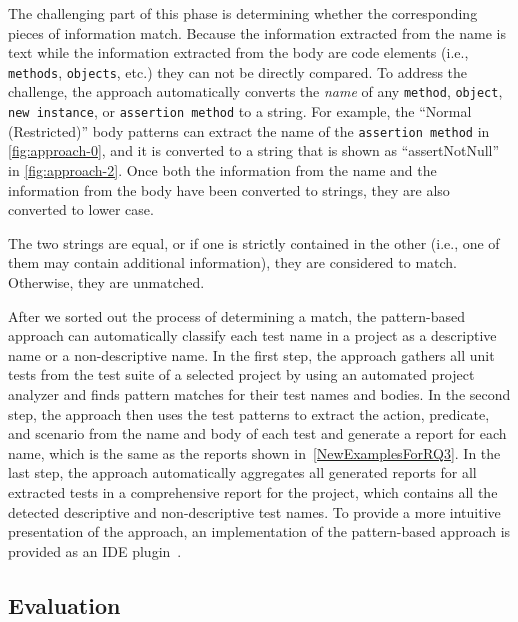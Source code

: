 The challenging part of this phase is determining whether the corresponding pieces of information match.
%
Because the information extracted from the name is text while the information extracted from the body are code elements (i.e., \texttt{methods}, \texttt{objects}, etc.) they can not be directly compared.
%
To address the challenge, the approach automatically converts the \emph{name} of any \texttt{method}, \texttt{object}, \texttt{new instance}, or \texttt{assertion method} to a string.
%
For example, the \enquote{Normal (Restricted)} body patterns can extract the name of the \texttt{assertion method} in \cref{fig:approach-0}, and it is converted to a string that is shown as \enquote{assertNotNull} in \cref{fig:approach-2}.
%
Once both the information from the name and the information from the body have been converted to strings, they are also converted to lower case.


The two strings are equal, or if one is strictly contained in the other (i.e., one of them may contain additional information), they are considered to match.
%
Otherwise, they are unmatched.


After we sorted out the process of determining a match, the pattern-based approach can automatically classify each test name in a project as a descriptive name or a non-descriptive name.
%
In the first step, the approach gathers all unit tests from the test suite of a selected project by using an automated project analyzer and finds pattern matches for their test names and bodies.
%
In the second step, the approach then uses the test patterns to extract the action, predicate, and scenario from the name and body of each test and generate a report for each name, which is the same as the reports shown in~\cref{NewExamplesForRQ3}.
%
In the last step, the approach automatically aggregates all generated reports for all extracted tests in a comprehensive report for the project, which contains all the detected descriptive and non-descriptive test names.
%
To provide a more intuitive presentation of the approach, an implementation of the pattern-based approach is provided as an IDE plugin~\cite{prototype}.


\subsection{Evaluation}
\label{sec:evaluation-pattern}

